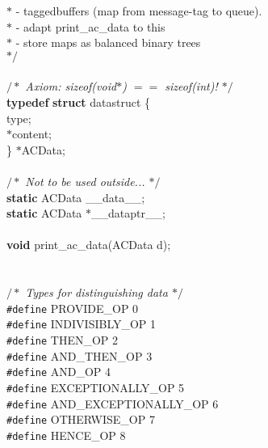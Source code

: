 \begin{flushleft}
{\hspace*{1\indentation}$\ast$ - taggedbuffers (map from message-tag to queue).\mbox{}\\
\hspace*{1\indentation}$\ast$ - adapt print\_ac\_data to this\mbox{}\\
\hspace*{1\indentation}$\ast$ - store maps as balanced binary trees\mbox{}\\
\hspace*{1\indentation}$\ast/$}\mbox{}\\
\mbox{}\\
{$/\ast$\it{} Axiom: sizeof(void$\ast$) $=$$=$ sizeof(int)! $\ast/$}\mbox{}\\
{\bf typedef} {\bf struct} datastruct \{\mbox{}\\
\hspace*{2\indentation}{\bf int} type;\mbox{}\\
\hspace*{2\indentation}{\bf void} $\ast$content;\mbox{}\\
\} $\ast$ACData;\mbox{}\\
\mbox{}\\
{$/\ast$\it{} Not to be used outside... $\ast/$}\mbox{}\\
{\bf static} ACData \_\_data\_\_;\mbox{}\\
{\bf static} ACData $\ast$\_\_dataptr\_\_;\mbox{}\\
\mbox{}\\
{\bf void} print\_ac\_data(ACData d);\mbox{}\\
\mbox{}\\
\mbox{}\\
{$/\ast$\it{} Types for distinguishing data $\ast/$}\mbox{}\\
{\tt \#define} PROVIDE\_OP             0\mbox{}\\
{\tt \#define} INDIVISIBLY\_OP         1\mbox{}\\
{\tt \#define} THEN\_OP                2\mbox{}\\
{\tt \#define} AND\_THEN\_OP            3\mbox{}\\
{\tt \#define} AND\_OP                 4\mbox{}\\
{\tt \#define} EXCEPTIONALLY\_OP       5\mbox{}\\
{\tt \#define} AND\_EXCEPTIONALLY\_OP   6\mbox{}\\
{\tt \#define} OTHERWISE\_OP           7\mbox{}\\
{\tt \#define} HENCE\_OP               8\mbox{}\\

\end{flushleft}
